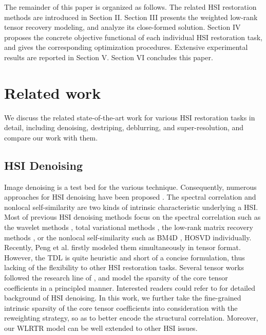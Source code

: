\documentclass[twocolumn]{svjour3}          %
\begin{document}
  The remainder of this paper is organized as follows. The related HSI restoration methods are introduced in Section II. Section III presents the weighted low-rank tensor recovery modeling, and analyze its close-formed solution. Section IV proposes the concrete objective functional of each individual HSI restoration task, and gives the corresponding optimization procedures. Extensive experimental results are reported in Section V. Section VI concludes this paper.


\section{Related work}
\label{sec:related}
We discuss the related state-of-the-art work for various HSI restoration tasks in detail, including denoising, destriping, deblurring, and super-resolution, and compare our work with them.

   \subsection{HSI Denoising}
    Image denoising is a test bed for the various technique. Consequently, numerous approaches for HSI denoising have been proposed \cite{zhang2016cluster,fu20163d,fu2017adaptive}. The spectral correlation and nonlocal self-similarity are two kinds of intrinsic characteristic underlying a HSI. Most of previous HSI denoising methods focus on the spectral correlation such as the wavelet methods \cite{othman2006noise}, total variational methods \cite{yuan2012hyperspectral}, the low-rank matrix recovery methods \cite{zhang2014hyperspectral, he2016total, zhao2015hyperspectral,cao2015low}, or the nonlocal self-similarity such as BM4D \cite{Maggioni2012Nonlocal}, HOSVD \cite{rajwade2013image} individually. Recently, Peng et al. \cite{peng2014decomposable} firstly modeled them simultaneously in tensor format. However, the TDL \cite{peng2014decomposable} is quite heuristic and short of a concise formulation, thus lacking of the flexibility to other HSI restoration tasks. Several tensor works \cite{dong2015low, xie2016multispectral, Chang2017Hyper} followed the research line of \cite{peng2014decomposable}, and model the sparsity of the core tensor coefficients in a principled manner. Interested readers could refer to \cite{xie2017kronecker} for detailed background of HSI denoising. In this work, we further take the fine-grained intrinsic sparsity of the core tensor coefficients into consideration with the reweighting strategy, so as to better encode the structural correlation. Moreover, our WLRTR model can be well extended to other HSI issues.
\end{document}
